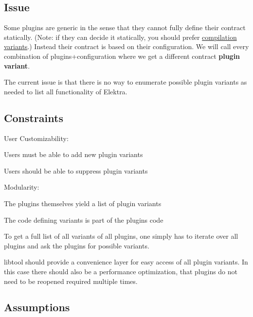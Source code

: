 \subsection*{Issue}

Some plugins are generic in the sense that they cannot fully define their contract statically. (Note\+: if they can decide it statically, you should prefer \hyperlink{doc_tutorials_compilation-variants_md}{compilation variants}.) Instead their contract is based on their configuration. We will call every combination of plugins+configuration where we get a different contract {\bfseries plugin variant}.

The current issue is that there is no way to enumerate possible plugin variants as needed to list all functionality of Elektra.

\subsection*{Constraints}


\begin{DoxyItemize}
\item User Customizability\+:
\begin{DoxyItemize}
\item Users must be able to add new plugin variants
\item Users should be able to suppress plugin variants
\end{DoxyItemize}
\item Modularity\+:
\begin{DoxyItemize}
\item The plugins themselves yield a list of plugin variants
\item The code defining variants is part of the plugin\textquotesingle{}s code
\item To get a full list of all variants of all plugins, one simply has to iterate over all plugins and ask the plugins for possible variants.
\end{DoxyItemize}
\item libtool should provide a convenience layer for easy access of all plugin variants. In this case there should also be a performance optimization, that plugins do not need to be reopened required multiple times.
\end{DoxyItemize}

\subsection*{Assumptions}


